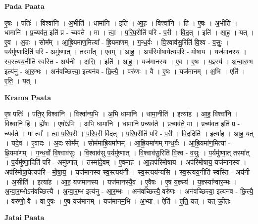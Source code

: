 \documentclass[17pt]{extarticle}
\begin{document}
\textbf{Pada Paata} \newline

ए॒षः । पतिः॑ । विश्वा॑नि । अ॒भीति॑ । धामा॑नि । इति॑ । आ॒ह॒ । विश्वा॑नि । हि । ए॒षः । अ॒भीति॑ । धामा॑नि । प्र॒च्यव॑त॒ इति॑ प्र - च्यव॑ते । मा । त्वा॒ । प॒रि॒प॒रीति॑ परि - प॒री । वि॒द॒त् । इति॑ । आ॒ह॒ । यत् । ए॒व । अ॒दः । सोम᳚म् । आ॒ह्रि॒यमा॑ण॒मित्या᳚ - ह्रि॒यमा॑णम् । ग॒न्ध॒र्वः । वि॒श्वाव॑सु॒रिति॑ वि॒श्व - व॒सुः॒ । प॒र्यमु॑ष्णा॒दिति॑ परि - अमु॑ष्णात् । तस्मा᳚त् । ए॒वम् । आ॒ह॒ । अप॑रिमोषा॒येत्यप॑रि - मो॒षा॒य॒ । यज॑मानस्य । स्व॒स्त्यय॒नीति॑ स्वस्ति - अय॑नी । अ॒सि॒ । इति॑ । आ॒ह॒ । यज॑मानस्य । ए॒व । ए॒षः । य॒ज्ञ्स्य॑ । अ॒न्वा॒र॒म्भ इत्य॑नु - आ॒र॒म्भः । अन॑वच्छित्त्या॒ इत्यन॑व - छि॒त्यै॒ । वरु॑णः । वै । ए॒षः । यज॑मानम् । अ॒भि । एति॑ । ए॒ति॒ । यत् ।  \newline


\textbf{Krama Paata} \newline

ए॒ष पतिः॑ । पति॒र् विश्वा॑नि । विश्वा᳚न्य॒भि । अ॒भि धामा॑नि । धामा॒नीति॑ । इत्या॑ह । आ॒ह॒ विश्वा॑नि । विश्वा॑नि॒ हि । ह्ये॑षः । ए॒षो॑ऽभि । अ॒भि धामा॑नि । धामा॑नि प्र॒च्यव॑ते । प्र॒च्यव॑ते॒ मा । प्र॒च्य॑वत॒ इति॑ प्र - च्यव॑ते । मा त्वा᳚ । त्वा॒ प॒रि॒प॒री । प॒रि॒प॒री वि॑दत् । प॒रि॒प॒रीति॑ परि - प॒री । वि॒द॒दिति॑ । इत्या॑ह । आ॒ह॒ यत् । यदे॒व । ए॒वादः । अ॒दः सोम᳚म् । सोम॑माह्रि॒यमा॑णम् । आ॒ह्रि॒यमा॑णम् गन्ध॒र्वः । आ॒ह्रि॒यमा॑ण॒मित्या᳚ - ह्रि॒यमा॑णम् । ग॒न्ध॒र्वो वि॒श्वाव॑सुः । वि॒श्वाव॑सु प॒र्यमु॑ष्णात् । वि॒श्वाव॑सु॒रिति॑ वि॒श्व - व॒सुः॒ । प॒र्यमु॑ष्णा॒त् तस्मा᳚त् । प॒र्यमु॑ष्णा॒दिति॑ परि - अमु॑ष्णात् । तस्मा॑दे॒वम् । ए॒वमा॑ह । आ॒हाप॑रिमोषाय । अप॑रिमोषाय॒ यज॑मानस्य । अप॑रिमोषा॒येत्यप॑रि - मो॒षा॒य॒ । यज॑मानस्य स्व॒स्त्यय॑नी । स्व॒स्त्यय॑न्यसि । स्व॒स्त्यय॒नीति॑ स्वस्ति - अय॑नी । अ॒सीति॑ । इत्या॑ह । आ॒ह॒ यज॑मानस्य । यज॑मानस्यै॒व । ए॒वैषः । ए॒ष य॒ज्ञ्स्य॑ । य॒ज्ञ्स्या᳚न्वार॒म्भः । अ॒न्वा॒र॒म्भोऽन॑वच्छित्त्यै । अ॒न्वा॒र॒म्भ इत्य॑नु - आ॒र॒म्भः । अन॑वच्छित्त्यै॒ वरु॑णः । अन॑वच्छित्त्या॒ इत्यन॑व - छि॒त्त्यै॒ । वरु॑णो॒ वै । वा ए॒षः । ए॒ष यज॑मानम् । यज॑मानम॒भि । अ॒भ्या । ऐति॑ । ए॒ति॒ यत् । यत् क्री॒तः \newline

\textbf{Jatai Paata} \newline
\end{document}

